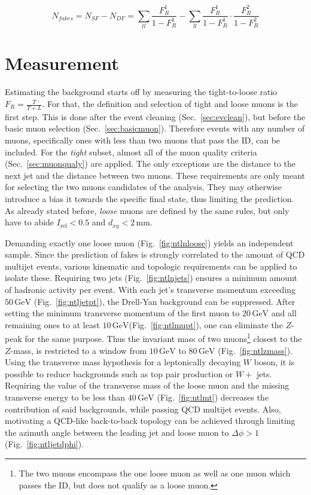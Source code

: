 \begin{equation}
  \label{eq:fakes}
  N_{fakes} = N_{SF} - N_{DF} =  \sum_{tl} \frac{F_R^1}{1 - F_R^1} - \sum_{ll} \frac{F_R^1}{1 - F_R^1} \cdot \frac{F_R^2}{1 - F_R^2}
\end{equation}


\section{Measurement}
\label{sec:tlmeasurement}

Estimating the background starts off by measuring the tight-to-loose ratio $F_R = \frac{T}{T+L}$. For that, the definition and selection of tight and loose muons is the first step. This is done after the event cleaning (Sec.~\ref{sec:evclean}), but before the basic muon selection (Sec.~\ref{sec:basicmuon}). Therefore events with any number of muons, specifically ones with less than two muons that pass the ID, can be included. For the \textit{tight} subset, almost all of the muon quality criteria (Sec.~\ref{sec:muonqualy}) are applied. The only exceptions are the distance to the next jet and the distance between two muons. These requirements are only meant for selecting the two muons candidates of the analysis. They may otherwise introduce a bias it towards the specific final state, thus limiting the prediction. As already stated before, \textit{loose} muons are defined by the same rules, but only have to abide $I_{\text{rel}} < 0.5$ and $d_{xy} < 2\,\text{mm}$.

Demanding exactly one loose muon (Fig.~\ref{fig:ntlnloose}) yields an independent sample. Since the prediction of fakes is strongly correlated to the amount of QCD multijet events, various kinematic and topologic requirements can be applied to isolate these. Requiring two jets (Fig.~\ref{fig:ntlnjets}) ensures a minimum amount of hadronic activity per event. With each jet's transverse momentum exceeding $50\,\text{GeV}$ (Fig.~\ref{fig:ntljetpt}), the Drell-Yan background can be suppressed. After setting the minimum transverse momentum of the first muon to $20\,\text{GeV}$ and all remaining ones to at least $10\,\text{GeV}$(Fig.~\ref{fig:ntlmupt}), one can eliminate the $Z$-peak for the same purpose. Thus the invariant mass of two muons\footnote{The two muons encompass the one loose muon as well as one muon which passes the ID, but does not qualify as a loose muon.} closest to the $Z$-mass, is restricted to a window from $10\,\text{GeV}$ to $80\,\text{GeV}$ (Fig.~\ref{fig:ntlzmass}). Using the transverse mass hypothesis for a leptonically decaying $W$ boson, it is possible to reduce backgrounds such as top pair production or $W +$ jets. Requiring the value of the transverse mass of the loose muon and the missing transverse energy to be less than $40\,\text{GeV}$ (Fig.~\ref{fig:ntlmt}) decreases the contribution of said backgrounds, while passing QCD multijet events. Also, motivating a QCD-like back-to-back topology can be achieved through limiting the azimuth angle between the leading jet and loose muon to $\Delta \phi > 1$ (Fig.~\ref{fig:ntljetdphi}).

